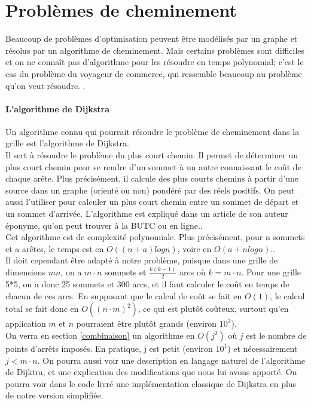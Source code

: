 \section{Problèmes de cheminement}
Beaucoup de problèmes d'optimisation peuvent être modélisés par un graphe et résolus par un algorithme de cheminement. Mais certains problèmes sont difficiles et on ne connaît pas d'algorithme pour les résoudre en temps polynomial; c'est le cas du problème du voyageur de commerce, qui ressemble beaucoup au problème qu'on veut résoudre. \cite{wiki:voyageurCommerce}.
\paragraph{L'algorithme de Dijkstra}
Un algorithme connu qui pourrait résoudre le problème de cheminement dans la grille est l'algorithme de Dijkstra.\\

Il sert à résoudre le problème du plus court chemin. Il permet de déterminer un plus court chemin pour se rendre d'un sommet à un autre connaissant le coût de chaque arête. Plus précisément, il calcule des plus courts chemins à partir d'une source dans un graphe (orienté ou non) pondéré par des réels positifs. On peut aussi l'utiliser pour calculer un plus court chemin entre un sommet de départ et un sommet d'arrivée. L'algorithme est expliqué dans un article de son auteur éponyme, qu'on peut trouver à la BUTC ou en ligne.\cite{dijkstra}.\\

Cet algorithme est de complexité polynomiale. Plus précisément, pour n sommets et a arêtes, le temps est en $O((n+a) log n)$, voire en $O(a + n log n)$.\cite{wiki:dijkstra}.\\

Il doit cependant être adapté à notre problème, puisque dans une grille de dimensions $mn$, on a $m\cdot n$ sommets et $\frac{k(k-1)}{2}$ arcs où $k=m\cdot n$. Pour une grille 5*5, on a donc 25 sommets et 300 arcs, et il faut calculer le coût en temps de chacun de ces arcs. En supposant que le calcul de coût se fait en $O(1)$, le calcul total se fait donc en $O((n\cdot m)^2)$, ce qui est plutôt coûteux, surtout qu'en application $m$ et $n$ pourraient être plutôt grands (environ $10^2$).\\

On verra en section \ref{combinaison} un algorithme en $O(j^2)$ où $j$ est le nombre de points d'arrêts imposés. En pratique, j est petit (environ $10^1$) et nécessairement $j<m\cdot n$. On pourra aussi voir une description en langage naturel de l'algorithme de Dijktra, et une explication des modifications que nous lui avons apporté. On pourra voir dans le code livré une implémentation classique de Dijkstra en plus de notre version simplifiée.
